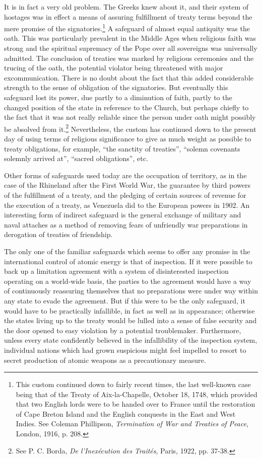 \begin{introduction}
It is in fact a very old problem. The Greeks knew about it, and their system of hostages was in effect a means of assuring fulfillment of treaty terms beyond the mere promise of the signatories.\footnote{This custom continued down to fairly recent times, the last well-known case being that of the Treaty of Aix-la-Chapelle, October 18, 1748, which provided that two English lords were to be handed over to France until the restoration of Cape Breton Island and the English conquests in the East and West Indies. See Coleman Phillipson, \textit{Termination of War and Treaties of Peace}, London, 1916, p. 208.} A safeguard of almost equal antiquity was the oath. This was particularly prevalent in the Middle Ages when religious faith was strong and the spiritual supremacy of the Pope over all sovereigns was universally admitted. The conclusion of treaties was marked by religious ceremonies and the trucing of the oath, the potential violator being threatened with major excommunication. There is no doubt about the fact that this added considerable strength to the sense of obligation of the signatories. But eventually this safeguard lost its power, due partly to a diminution of faith, partly to the changed position of the state in reference to the Church, but perhaps chiefly to the fact that it was not really reliable since the person under oath might possibly be absolved from it.\footnote{See P. C. Borda, \textit{De l'Inex\'ecution des Trait\'es}, Paris, 1922, pp. 37-38.} Nevertheless, the custom has continued down to the present day of using terms of religious significance to give as much weight as possible to treaty obligations, for example, ``the sanctity of treaties'', ``solemn covenants solemnly arrived at'', ``sacred obligations'', etc.

Other forms of safeguards used today are the occupation of territory, as in the case of the Rhineland after the First World War, the guarantee by third powers of the fulfillment of a treaty, and the pledging of certain sources of revenue for the execution of a treaty, as Venezuela did to the European powers in 1902. An interesting form of indirect safeguard is the general exchange of military and naval attaches as a method of removing fears of unfriendly war preparations in derogation of treaties of friendship.

The only one of the familiar safeguards which seems to offer any promise in the international control of atomic energy is that of inspection. If it were possible to back up a limitation agreement with a system of disinterested inspection operating on a world-wide basis, the parties to the agreement would have a way of continuously reassuring themselves that no preparations were under way within any state to evade the agreement. But if this were to be the only safeguard, it would have to be practically infallible, in fact as well as in appearance; otherwise the states living up to the treaty would be lulled into a sense of false security and the door opened to easy violation by a potential troublemaker. Furthermore, unless every state confidently believed in the infallibility of the inspection system, individual nations which had grown suspicious might feel impelled to resort to secret production of atomic weapons as a precautionary measure.


\end{introduction}
